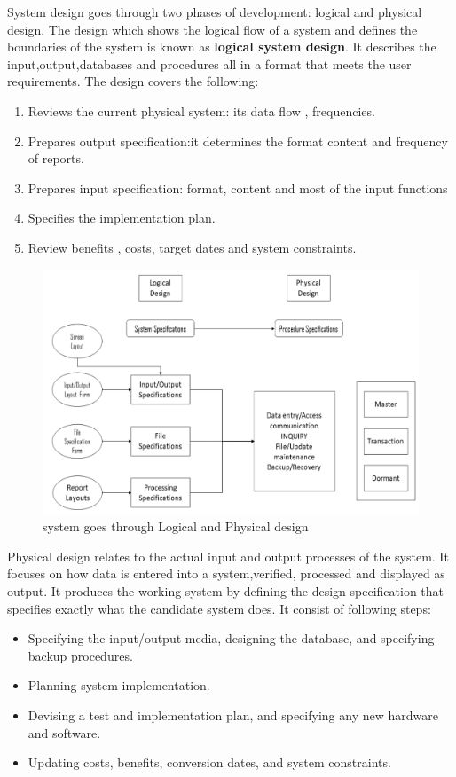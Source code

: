 \documentclass[a4paper,12pt]{report}
\begin{document}
	System design goes through two phases of development: logical and physical design. The design which shows the logical flow of a system and defines the boundaries of the system is known as \textbf{logical system design}. It describes the input,output,databases and procedures all in a format that meets the user requirements. The design covers the following: 
	\begin{enumerate}
		\item	Reviews the current physical system: its data flow , frequencies.
		\item 	Prepares output specification:it determines the format content and frequency of reports.
		\item 	Prepares input specification: format, content and most of the input functions
		\item 	Specifies the implementation plan.
		\item	Review benefits , costs, target dates and system constraints.
	\end{enumerate}
\begin{figure}[h]
	\centering
	\includegraphics[width=0.7\linewidth]{9_1}
	\caption{system goes through Logical and Physical design}
	\label{fig:92}
\end{figure}
Physical design relates to the actual input and output processes of the system. It focuses on how data is entered into a system,verified, processed and displayed as output. It produces the working system by defining the design specification that specifies exactly what the candidate system does. It consist of following steps:	
	
	\begin{itemize}
		\item Specifying the input/output media, designing the database, and specifying    backup procedures.
		\item  Planning system implementation.
		\item  Devising a test and implementation plan, and specifying any new hardware         and software.
		\item  Updating costs, benefits, conversion dates, and system constraints.
		
	\end{itemize}
\end{document}
